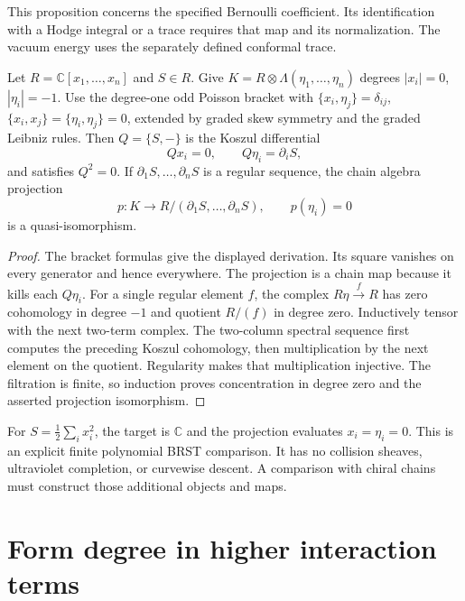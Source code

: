 This proposition concerns the specified Bernoulli coefficient.
Its identification with a Hodge integral or a trace requires that map and its normalization.
The vacuum energy uses the separately defined conformal trace.

\begin{theorem}
\label{thm:cbc26-finite-bv}
Let $R=\mathbb C[x_1,\ldots,x_n]$ and $S\in R$.
Give $K=R\otimes\Lambda(\eta_1,\ldots,\eta_n)$ degrees $|x_i|=0$, $|\eta_i|=-1$.
Use the degree-one odd Poisson bracket with $\{x_i,\eta_j\}=\delta_{ij}$, $\{x_i,x_j\}=\{\eta_i,\eta_j\}=0$, extended by graded skew symmetry and the graded Leibniz rules.
Then $Q=\{S,-\}$ is the Koszul differential
\[
 Qx_i=0,\qquad Q\eta_i=\partial_i S,
\]
and satisfies $Q^2=0$.
If $\partial_1S,\ldots,\partial_nS$ is a regular sequence, the chain algebra projection
\[
 p:K\longrightarrow R/(\partial_1S,\ldots,\partial_nS),
 \qquad p(\eta_i)=0
\]
is a quasi-isomorphism.
\end{theorem}
\begin{proof}
The bracket formulas give the displayed derivation.
Its square vanishes on every generator and hence everywhere.
The projection is a chain map because it kills each $Q\eta_i$.
For a single regular element $f$, the complex $R\eta\xrightarrow{f}R$ has zero cohomology in degree $-1$ and quotient $R/(f)$ in degree zero.
Inductively tensor with the next two-term complex.
The two-column spectral sequence first computes the preceding Koszul cohomology, then multiplication by the next element on the quotient.
Regularity makes that multiplication injective.
The filtration is finite, so induction proves concentration in degree zero and the asserted projection isomorphism.
\end{proof}

For $S=\tfrac12\sum_i x_i^2$, the target is $\mathbb C$ and the projection evaluates $x_i=\eta_i=0$.
This is an explicit finite polynomial BRST comparison.
It has no collision sheaves, ultraviolet completion, or curvewise descent.
A comparison with chiral chains must construct those additional objects and maps.

\section{Form degree in higher interaction terms}

